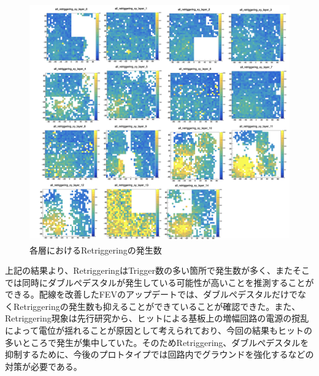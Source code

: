 \begin{figure}[H]
\begin{center}
 \includegraphics[keepaspectratio, scale=0.45]
 	{Figure/Beamtest/retrigger.png}
 		\caption[Retriggeirngのマップ]{各層におけるRetriggeringの発生数}
		\label{retrigger}
\end{center}
\end{figure}

上記の結果より、RetriggeringはTrigger数の多い箇所で発生数が多く、またそこでは同時にダブルぺデスタルが発生している可能性が高いことを推測することができる。配線を改善したFEVのアップデートでは、ダブルぺデスタルだけでなくRetriggeringの発生数も抑えることができていることが確認できた。また、Retriggering現象は先行研究から、ヒットによる基板上の増幅回路の電源の撹乱によって電位が揺れることが原因として考えられており、今回の結果もヒットの多いところで発生が集中していた。そのためRetriggering、ダブルぺデスタルを抑制するために、今後のプロトタイプでは回路内でグラウンドを強化するなどの対策が必要である。
